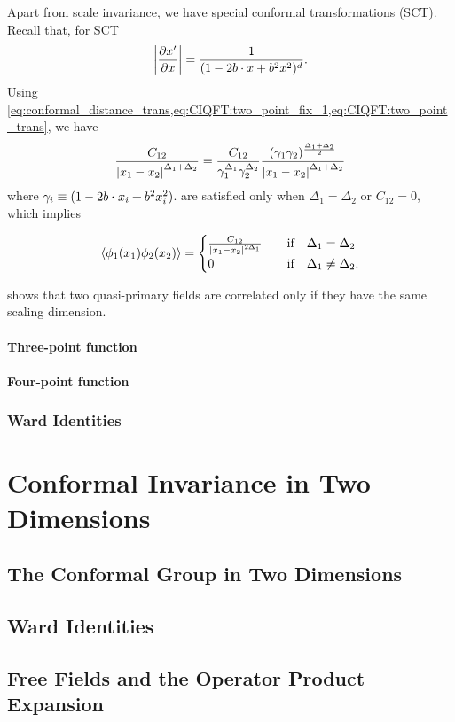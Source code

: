 \documentclass[10pt]{article}
\newenvironment{boxmath}[1]{\begin{tcolorbox}[enhanced,attach boxed title to top center={yshift=-\tcboxedtitleheight/2},boxrule=1pt,title={\centering #1},colframe=NavyBlue!70!black,colback=NavyBlue!10,colbacktitle=NavyBlue!10,fonttitle=\scshape,coltitle=Black]}{\end{tcolorbox}}
\begin{document}
Apart from scale invariance, we have special conformal transformations (SCT).
Recall that, for SCT  
\begin{align}
    \abs{\pdv{x'}{x}}=\frac{1}{(1-2b\cdot x+b^2 x^2)^d}.
\end{align}
Using \cref{eq:conformal_distance_trans,eq:CIQFT:two_point_fix_1,eq:CIQFT:two_point_trans}, we have 
\begin{align}
    \frac{C_{12}}{\abs{x_1-x_2}^{\Delta_1+\Delta_2}}=\frac{C_{12}}{\gamma_1^{\Delta_1}\gamma_2^{\Delta_2}}\frac{(\gamma_1\gamma_2)^{\frac{\Delta_1+\Delta_2}{2}}}{\abs{x_1-x_2}^{\Delta_1+\Delta_2}}\label{eq:CIQFT:2_point_constraint_1}
\end{align}
where $\gamma_i\equiv(1-2b\vdot x_i+b^2 x_i^2)$.
 are satisfied only when $\Delta_1=\Delta_2$ or $C_{12}=0$, which implies 
\begin{boxmath}{2-point function}
    \begin{align}\label{eq:CIQFT:2_point_final}
        \expval{\phi_1(x_1)\phi_2(x_2)}=\begin{cases}
            \frac{C_{12}}{\abs{x_1-x_2}^{2\Delta_1}}&\qif\Delta_1=\Delta_2\\
            0&\qif\Delta_1\neq\Delta_2.
        \end{cases}
    \end{align}
\end{boxmath}
\begin{remark}
     shows that two quasi-primary fields are correlated only if they have the same scaling dimension.
\end{remark}
\paragraph{Three-point function}
\paragraph{Four-point function}


\subsubsection{Ward Identities}
\section{Conformal Invariance in Two Dimensions}
\subsection{The Conformal Group in Two Dimensions}
\subsection{Ward Identities}
\subsection{Free Fields and the Operator Product Expansion}

\clearpage


\end{document}
